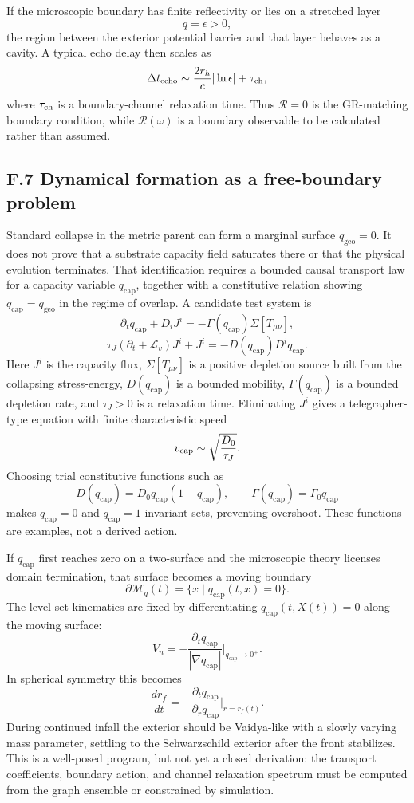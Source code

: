 \documentclass[11pt]{article}
\begin{document}
If the microscopic boundary has finite reflectivity or lies on a stretched layer
\[
q=\epsilon>0,
\]
the region between the exterior potential barrier and that layer behaves as a cavity. A typical echo delay then scales as
\[
\Delta t_{\rm echo}
\sim
\frac{2r_h}{c}|\ln\epsilon|+\tau_{\rm ch},
\]
where $\tau_{\rm ch}$ is a boundary-channel relaxation time. Thus $\mathcal R=0$ is the GR-matching boundary condition, while $\mathcal R(\omega)$ is a boundary observable to be calculated rather than assumed.

\subsection*{F.7 Dynamical formation as a free-boundary problem}

Standard collapse in the metric parent can form a marginal surface $q_{\mathrm{geo}}=0$. It does not prove that a substrate capacity field saturates there or that the physical evolution terminates. That identification requires a bounded causal transport law for a capacity variable $q_{\mathrm{cap}}$, together with a constitutive relation showing $q_{\mathrm{cap}}=q_{\mathrm{geo}}$ in the regime of overlap. A candidate test system is
\[
\partial_t q_{\mathrm{cap}}+D_iJ^i
=-\Gamma(q_{\mathrm{cap}})\Sigma[T_{\mu\nu}],
\]
\[
\tau_J(\partial_t+\mathcal{L}_v)J^i+J^i
=-D(q_{\mathrm{cap}})D^i q_{\mathrm{cap}}.
\]
Here $J^i$ is the capacity flux, $\Sigma[T_{\mu\nu}]$ is a positive depletion source built from the collapsing stress-energy, $D(q_{\mathrm{cap}})$ is a bounded mobility, $\Gamma(q_{\mathrm{cap}})$ is a bounded depletion rate, and $\tau_J>0$ is a relaxation time. Eliminating $J^i$ gives a telegrapher-type equation with finite characteristic speed
\[
v_{\rm cap}\sim \sqrt{\frac{D_0}{\tau_J}}.
\]
Choosing trial constitutive functions such as
\[
D(q_{\mathrm{cap}})=D_0q_{\mathrm{cap}}(1-q_{\mathrm{cap}}),
\qquad
\Gamma(q_{\mathrm{cap}})=\Gamma_0q_{\mathrm{cap}}
\]
makes $q_{\mathrm{cap}}=0$ and $q_{\mathrm{cap}}=1$ invariant sets, preventing overshoot. These functions are examples, not a derived action.

If $q_{\mathrm{cap}}$ first reaches zero on a two-surface and the microscopic theory licenses domain termination, that surface becomes a moving boundary
\[
\partial\mathcal{M}_q(t)=\{x\mid q_{\mathrm{cap}}(t,x)=0\}.
\]
The level-set kinematics are fixed by differentiating $q_{\mathrm{cap}}(t,X(t))=0$ along the moving surface:
\[
V_n=-\frac{\partial_t q_{\mathrm{cap}}}{|\nabla q_{\mathrm{cap}}|}
\bigg|_{q_{\mathrm{cap}}\to0^+}.
\]
In spherical symmetry this becomes
\[
\frac{dr_f}{dt}
=-\frac{\partial_t q_{\mathrm{cap}}}{\partial_r q_{\mathrm{cap}}}
\bigg|_{r=r_f(t)}.
\]
During continued infall the exterior should be Vaidya-like with a slowly varying mass parameter, settling to the Schwarzschild exterior after the front stabilizes. This is a well-posed program, but not yet a closed derivation: the transport coefficients, boundary action, and channel relaxation spectrum must be computed from the graph ensemble or constrained by simulation.
\end{document}
